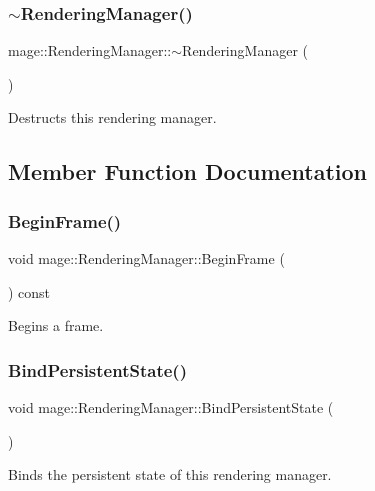 \subsubsection{\texorpdfstring{$\sim$\+Rendering\+Manager()}{~RenderingManager()}}
{\footnotesize\ttfamily mage\+::\+Rendering\+Manager\+::$\sim$\+Rendering\+Manager (\begin{DoxyParamCaption}{ }\end{DoxyParamCaption})}

Destructs this rendering manager. 

\subsection{Member Function Documentation}
\hypertarget{classmage_1_1_rendering_manager_ab1fe907a08658a8cf57217eb5a48728f}{}\label{classmage_1_1_rendering_manager_ab1fe907a08658a8cf57217eb5a48728f} 
\subsubsection{\texorpdfstring{Begin\+Frame()}{BeginFrame()}}
{\footnotesize\ttfamily void mage\+::\+Rendering\+Manager\+::\+Begin\+Frame (\begin{DoxyParamCaption}{ }\end{DoxyParamCaption}) const}

Begins a frame. \hypertarget{classmage_1_1_rendering_manager_adadab213b9aabdc6167a012d340084a6}{}\label{classmage_1_1_rendering_manager_adadab213b9aabdc6167a012d340084a6} 
\subsubsection{\texorpdfstring{Bind\+Persistent\+State()}{BindPersistentState()}}
{\footnotesize\ttfamily void mage\+::\+Rendering\+Manager\+::\+Bind\+Persistent\+State (\begin{DoxyParamCaption}{ }\end{DoxyParamCaption})}

Binds the persistent state of this rendering manager.


